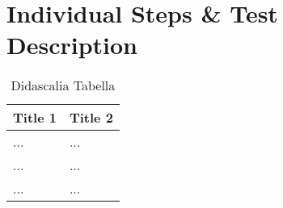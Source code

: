 \chapter{Individual Steps \& Test Description} \label{chap3}

\begin{table}[htbp]
\begin{center}
\begin{tabular}[t]{p{}p{}}

\hline
\textbf{Title 1} & \textbf{Title 2} \\
\hline
... & ... \\
\hline
... & ... \\
\hline
... & ... \\
\hline

\end{tabular}
\end{center}
\caption{Didascalia Tabella}
\end{table}
\clearpage
